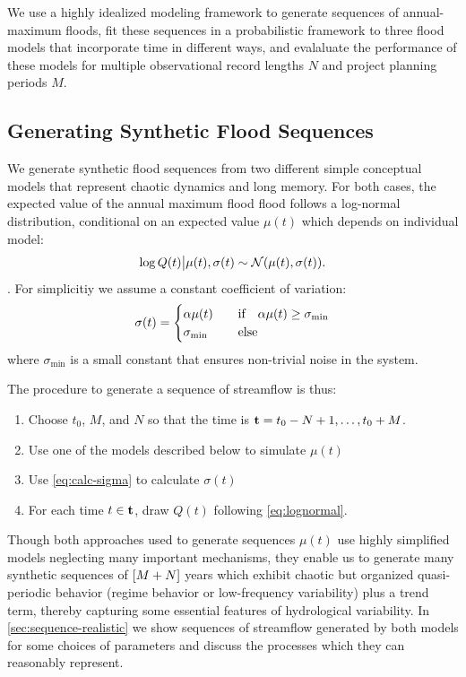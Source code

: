 \documentclass[12pt]{article}
\begin{document}
We use a highly idealized modeling framework to generate sequences of annual-maximum floods, fit these sequences in a probabilistic framework to three flood models that incorporate time in different ways, and evalaluate the performance of these models for multiple observational record lengths \(N\) and project planning periods \(M\).

\subsection{Generating Synthetic Flood Sequences\label{sec:methods-generating}}

We generate synthetic flood sequences from two different simple conceptual models that represent chaotic dynamics and long memory.
For both cases, the expected value of the annual maximum flood flood follows a log-normal distribution, conditional on an expected value \(\mu(t)\) which depends on individual model:
\begin{equation} \label{eq:lognormal}
  \log Q(t) \big| \mu(t),\sigma(t) \sim \mathcal{N} \qty(\mu(t), \sigma(t)).
\end{equation}.
For simplicitiy we assume a constant coefficient of variation:
\begin{equation}\label{eq:calc-sigma}
  \sigma(t) = 
  \begin{cases} 
    \alpha \mu(t) & \qqtext{if} \alpha \mu(t) \geq \sigma_\text{min} \\ 
    \sigma_\text{min} & \qqtext{else}
  \end{cases}
\end{equation}
where \(\sigma_\text{min}\) is a small constant that ensures non-trivial noise in the system.

The procedure to generate a sequence of streamflow is thus:
\begin{enumerate}
  \item Choose \(t_0\), \(M\), and \(N\) so that the time is \(\vb{t}=t_0-N+1, \ldots, t_0+M\).
  \item Use one of the models described below to simulate \(\mu(t)\)
  \item Use \cref{eq:calc-sigma} to calculate \(\sigma(t)\)
  \item For each time \(t \in \vb{t}\), draw \(Q(t)\) following \cref{eq:lognormal}.
\end{enumerate}
Though both approaches used to generate sequences \( \mu(t) \) use highly simplified models neglecting many important mechanisms, they enable us to generate many synthetic sequences of \(\qty[M + N]\) years which exhibit chaotic but organized quasi-periodic behavior (regime behavior or low-frequency variability) plus a trend term, thereby capturing some essential features of hydrological variability.
In \cref{sec:sequence-realistic} we show sequences of streamflow generated by both models for some choices of parameters and discuss the processes which they can reasonably represent.
\end{document}
